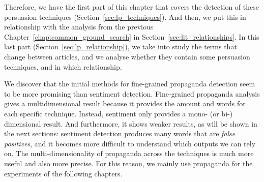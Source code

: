 

Therefore, we have the first part of this chapter that covers the detection of these persuasion techniques (Section~\ref{sec:lp_techniques}).
And then, we put this in relationship with the analysis from the previous Chapter~\ref{chap:common_ground_search} in Section~\ref{sec:lit_relationships}.
In this last part (Section~\ref{sec:lp_relationship}), 
we take into study the terms that change between articles, and we analyse whether they contain some persuasion techniques, and in which relationship. %



We discover that
the initial methods for fine-grained propaganda detection seem to be more promising %
than sentiment detection.
Fine-grained propaganda analysis gives a multidimensional result because it provides the amount and words for each specific technique. Instead, sentiment only provides a mono- (or bi-) dimensional result. And furthermore, it shows weaker results, as will be shown in the next sections: sentiment detection produces many words that are \emph{false positives}, and it becomes more difficult to understand which outputs we can rely on.
The multi-dimensionality of propaganda across the techniques is much more useful and also more precise.
For this reason, we mainly use propaganda for the experiments of the following chapters. 

